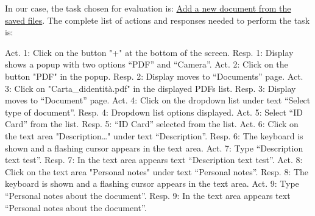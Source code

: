 In our case, the task chosen for evaluation is: \underline{Add a new document from the saved files}. The complete list of actions and responses needed to perform the task is:\newline\newline

Act. 1: Click on the button "+" at the bottom of the screen.\newline
Resp. 1: Display shows a popup with two options “PDF” and “Camera”.\newline\newline
Act. 2: Click on the button "PDF" in the popup.\newline
Resp. 2: Display moves to “Documents” page.\newline\newline
Act. 3: Click on "Carta\_didentità.pdf" in the displayed PDFs list.\newline
Resp. 3: Display moves to “Document” page.\newline\newline
Act. 4: Click on the dropdown list under text “Select type of document”.\newline
Resp. 4: Dropdown list options displayed.\newline\newline
Act. 5: Select “ID Card” from the list.\newline
Resp. 5: “ID Card” selected from the list.\newline\newline
Act. 6: Click on the text area "Description…" under text “Description”.\newline
Resp. 6: The keyboard is shown and a flashing cursor appears in the text area.\newline\newline
Act. 7: Type “Description text test”.\newline
Resp. 7: In the text area appears text “Description text test”.\newline\newline
Act. 8: Click on the text area "Personal notes" under text “Personal notes”.\newline
Resp. 8: The keyboard is shown and a flashing cursor appears in the text area.\newline\newline
Act. 9: Type “Personal notes about the document”.\newline
Resp. 9: In the text area appears text “Personal notes about the document”.\newline\newline
